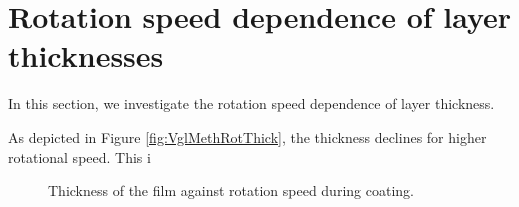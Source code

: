 \section{Rotation speed dependence of layer thicknesses}
\label{sec:rot}

In this section, we investigate the rotation speed dependence of layer thickness.


As depicted in Figure \ref{fig:VglMethRotThick}, the thickness declines for higher rotational speed. This i

\begin{figure}[h]
    \centering
    
    \caption{Thickness of the film against rotation speed during coating.}
    \label{fig:VglMethConcThick}
\end{figure}
